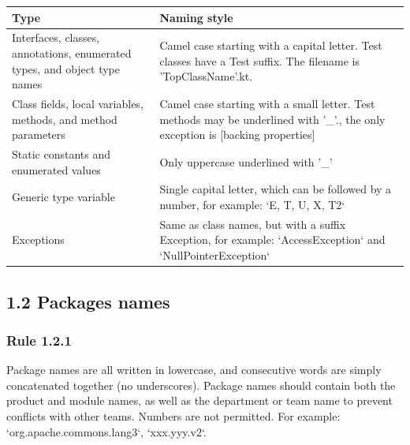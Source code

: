 \begin{center}

\begin{tabular}{ |p{}|p{}| }

\hline

Type&Naming style\\

\hline

 Interfaces, classes, annotations, enumerated types, and object type names & Camel case starting with a capital letter. Test classes have a Test suffix. The filename is 'TopClassName'.kt.  \\

 Class fields, local variables, methods, and method parameters & Camel case starting with a small letter. Test methods may be underlined with '\_'., the only exception is [backing properties] \\

 Static constants and enumerated values & Only uppercase underlined with '\_' \\

 Generic type variable & Single capital letter, which can be followed by a number, for example: `E, T, U, X, T2` \\

 Exceptions & Same as class names, but with a suffix Exception, for example: `AccessException` and `NullPointerException`\\

\hline

\end{tabular}

\end{center}

\subsection*{\textbf{1.2 Packages names}}

\subsubsection*{\textbf{Rule 1.2.1}}
\leavevmode\newline

Package names are all written in lowercase, and consecutive words are simply concatenated together (no underscores). Package names should contain both the product and module names, as well as the department or team name to prevent conflicts with other teams.  Numbers are not permitted. For example: `org.apache.commons.lang3`, `xxx.yyy.v2`.



